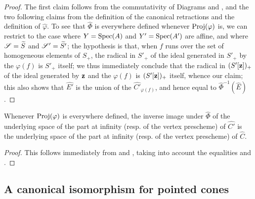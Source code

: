 \begin{proof}
The first claim follows from the commutativity of Diagrams  and , and the two following claims from the definition of the canonical retractions  and the definition of $\widehat{\varphi}$.
To see that $\widehat{\Phi}$ is everywhere defined whenever $\operatorname{Proj}(\varphi)$ is, we can restrict to the case where $Y=\operatorname{Spec}(A)$ and $Y'=\operatorname{Spec}(A')$ are affine, and where $\mathscr{S}=\widetilde{S}$ and $\mathscr{S}'=\widetilde{S'}$;
the hypothesis is that, when $f$ runs over the set of homogeneous elements of $S_+$, the radical in $S'_+$ of the ideal generated in $S'_+$ by the $\varphi(f)$ is $S'_+$ itself;
we thus immediately conclude that the radical in $(S'[\mathbf{z}])_+$ of the ideal generated by $\mathbf{z}$ and the $\varphi(f)$ is $(S'[\mathbf{z}])_+$ itself, whence our claim;
this also shows that $\widehat{E'}$ is the union of the $\widehat{C'}_{\varphi(f)}$, and hence equal to $\widehat{\Phi}^{-1}(\widehat{E})$.
\end{proof}

\begin{corollary}[8.5.5]
\label{II.8.5.5}
Whenever $\operatorname{Proj}(\varphi)$ is everywhere defined, the inverse image under $\widehat{\Phi}$ of the underlying space of the part at infinity (resp. of the vertex prescheme) of $\widehat{C'}$ is the underlying space of the part at infinity (resp. of the vertex prescheme) of $\widehat{C}$.
\end{corollary}

\begin{proof}
This follows immediately from  and , taking into account the equalities  and .
\end{proof}


\subsection{A canonical isomorphism for pointed cones}
\label{subsection:II.8.6}


